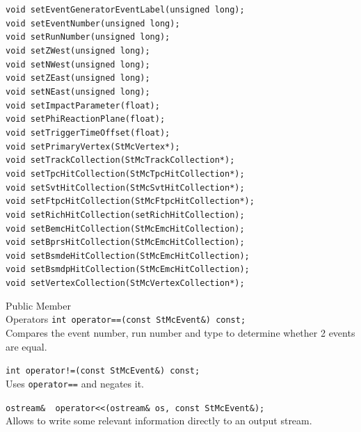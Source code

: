 \begin{Entry}
    \verb+void setEventGeneratorEventLabel(unsigned long);+\\
    \verb+void setEventNumber(unsigned long);+\\
    \verb+void setRunNumber(unsigned long);+\\
    \verb+void setZWest(unsigned long);+\\
    \verb+void setNWest(unsigned long);+\\
    \verb+void setZEast(unsigned long);+\\
    \verb+void setNEast(unsigned long);+\\
    \verb+void setImpactParameter(float);+\\
    \verb+void setPhiReactionPlane(float);+\\
    \verb+void setTriggerTimeOffset(float);+\\
    \verb+void setPrimaryVertex(StMcVertex*);+\\
    \verb+void setTrackCollection(StMcTrackCollection*);+\\
    \verb+void setTpcHitCollection(StMcTpcHitCollection*);+\\
    \verb+void setSvtHitCollection(StMcSvtHitCollection*);+\\
    \verb+void setFtpcHitCollection(StMcFtpcHitCollection*);+\\
    \verb+void setRichHitCollection(setRichHitCollection);+\\
    \verb+void setBemcHitCollection(StMcEmcHitCollection);+\\
    \verb+void setBprsHitCollection(StMcEmcHitCollection);+\\
    \verb+void setBsmdeHitCollection(StMcEmcHitCollection);+\\
    \verb+void setBsmdpHitCollection(StMcEmcHitCollection);+\\
    \verb+void setVertexCollection(StMcVertexCollection*);+\\

\item[Public Member\\ Operators]
    \verb+int operator==(const StMcEvent&) const;+\\
    Compares the event number, run number and type to determine
    whether 2 events are equal.

    \verb+int operator!=(const StMcEvent&) const;+\\
    Uses {\tt operator==} and negates it.

    \verb+ostream&  operator<<(ostream& os, const StMcEvent&);+\\
    Allows to write some relevant information directly to an output
    stream.


\end{Entry}
